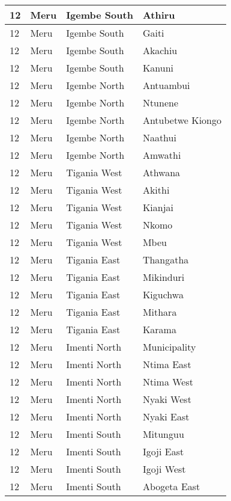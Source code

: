 \begin{table}[!ht]
\begin{tabular}{|l|l|l|l|}
        12 & Meru & Igembe South & Athiru \\ \hline
        12 & Meru & Igembe South & Gaiti \\ \hline
        12 & Meru & Igembe South & Akachiu \\ \hline
        12 & Meru & Igembe South & Kanuni \\ \hline
        12 & Meru & Igembe North & Antuambui \\ \hline
        12 & Meru & Igembe North & Ntunene \\ \hline
        12 & Meru & Igembe North & Antubetwe Kiongo \\ \hline
        12 & Meru & Igembe North & Naathui \\ \hline
        12 & Meru & Igembe North & Amwathi \\ \hline
        12 & Meru & Tigania West & Athwana \\ \hline
        12 & Meru & Tigania West & Akithi \\ \hline
        12 & Meru & Tigania West & Kianjai \\ \hline
        12 & Meru & Tigania West & Nkomo \\ \hline
        12 & Meru & Tigania West & Mbeu \\ \hline
        12 & Meru & Tigania East & Thangatha \\ \hline
        12 & Meru & Tigania East & Mikinduri \\ \hline
        12 & Meru & Tigania East & Kiguchwa \\ \hline
        12 & Meru & Tigania East & Mithara \\ \hline
        12 & Meru & Tigania East & Karama \\ \hline
        12 & Meru & Imenti North & Municipality \\ \hline
        12 & Meru & Imenti North & Ntima East \\ \hline
        12 & Meru & Imenti North & Ntima West \\ \hline
        12 & Meru & Imenti North & Nyaki West \\ \hline
        12 & Meru & Imenti North & Nyaki East \\ \hline
        12 & Meru & Imenti South & Mitunguu \\ \hline
        12 & Meru & Imenti South & Igoji East \\ \hline
        12 & Meru & Imenti South & Igoji West \\ \hline
        12 & Meru & Imenti South & Abogeta East \\ \hline

\end{tabular}
\end{table}
